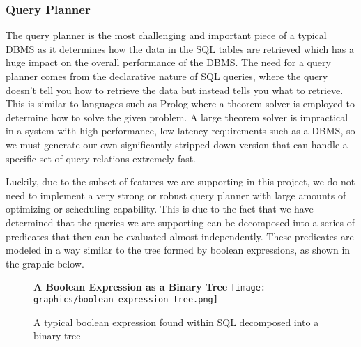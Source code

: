 \documentclass[letterpaper, 12pt]{article}
\begin{document}
\subsubsection{Query Planner}
The query planner is the most challenging and important piece of a typical DBMS as it
determines how the data in the SQL tables are retrieved which has a huge impact on
the overall performance of the DBMS. The need for a query planner comes from the
declarative nature of SQL queries, where the query doesn't tell you how to retrieve the
data but instead tells you what to retrieve. This is similar to languages such as Prolog where
a theorem solver is employed to determine how to solve the given problem. A large theorem
solver is impractical in a system with high-performance, low-latency requirements such as
a DBMS, so we must generate our own significantly stripped-down version that can handle a
specific set of query relations extremely fast.
\par\vspace{\baselineskip}
Luckily, due to the subset of features we are supporting in this project, we do not need to
implement a very strong or robust query planner with large amounts of optimizing or scheduling
capability. This is due to the fact that we have determined that the queries we are supporting
can be decomposed into a series of predicates that then can be evaluated almost independently.
These predicates are modeled in a way similar to the tree formed by boolean expressions, as shown
in the graphic below.
\par\vspace{\baselineskip}
\begin{figure}
 \centering
 \textbf{A Boolean Expression as a Binary Tree}
 \texttt{[image: graphics/boolean\_expression\_tree.png]}
 \caption{A typical boolean expression found within SQL decomposed into a binary tree}
\end{figure}
\end{document}
